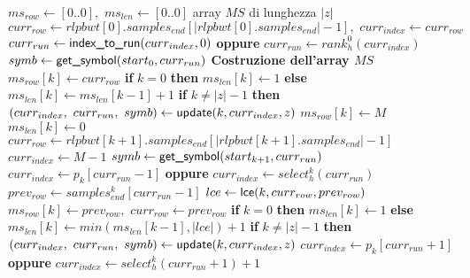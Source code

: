 \begin{algorithm}
  \footnotesize
  \begin{algorithmic}[1]
    \State $ms_{row}\gets [0..0],\,\,ms_{len}\gets [0..0]$
    \Comment array $MS$ di lunghezza $|z|$
    \State $curr_{row}\gets
    rlpbwt[0].samples_{end}[|rlpbwt[0].samples_{end}|-1],\,\,curr_{index}\gets
    curr_{row}$ 
    \State $curr_{run}\gets \mbox{\rm {\sf index\_to\_run}}(curr_{index},0)$ \textbf{oppure}
    $curr_{run}\gets rank_h^0(curr_{index})$  
    \State $symb\gets \mbox{\rm {\sf get\_symbol}}(start_0, curr_{run})$
    \Comment \textbf{Costruzione dell'array $MS$}
    \For {\textit{every} $k\in[0, |z|)$}
    \State $ms_{row}[k]\gets curr_{row}$
    \State \hspace{0.1mm}\textbf{if} $k=0$ \textbf{then} $ms_{len}[k] \gets 1$ \textbf{else}
    $ms_{len}[k] \gets ms_{len}[k-1]+1$
    \State \textbf{if} $k\neq |z|-1$ \textbf{then}
    $(curr_{index},\,\,curr_{run},\,\,symb)\gets \mbox{\rm {\sf update}}(k, curr_{index},z)$
    \Else 
    \State $ms_{row}[k]\gets M$
    \State $ms_{len}[k]\gets 0$
    \State $curr_{row}\gets
    rlpbwt[k+1].samples_{end}[|rlpbwt[k+1].samples_{end}|-1]$
    \State $curr_{index}\gets M-1$
    \State $symb\gets \mbox{\rm {\sf get\_symbol}}(start_{k+1}, curr_{run})$
    \EndIf
    \Else
    \State $curr_{index}\gets p_k[curr_{run}-1]$ \textbf{oppure}
    $curr_{index}\gets select_h^k(curr_{run})$
    \State $prev_{row}\gets
    samples_{end}^k[curr_{run}-1]$ 
    \State $lce\gets \mbox{\rm {\sf lce}}(k, curr_{row}, prev_{row})$
    \State $ms_{row}[k]\gets prev_{row},\,\,curr_{row}\gets prev_{row}$
    \State \textbf{if} $k=0$ \textbf{then} $ms_{len}[k] \gets 1$ \textbf{else}
    $ms_{len}[k] \gets min(ms_{len}[k-1], |lce|)+1$ 
    \State \textbf{if} $k\neq |z|-1$ \textbf{then}
    $(curr_{index},\,\,curr_{run},\,\,symb)\gets \mbox{\rm {\sf update}}(k, curr_{index},z)$  
    \State $curr_{index}\gets p_k[curr_{run}+1]$ \textbf{oppure}
    $curr_{index}\gets select_h^k(curr_{run}+1)+1$

\end{algorithmic}
\end{algorithm}
